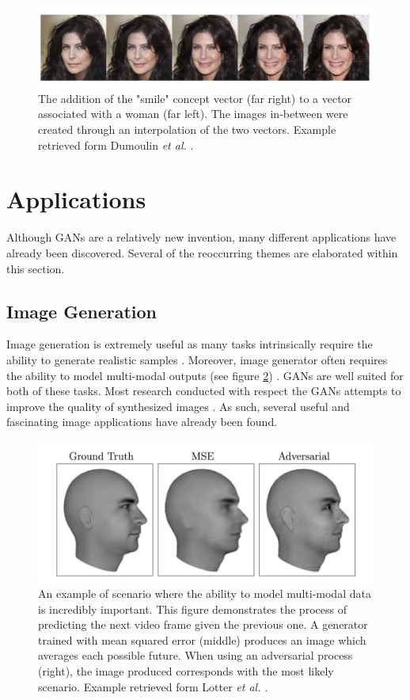 \documentclass[11pt]{article}
\begin{document}
\begin{figure}
\centering
\includegraphics[scale=0.40]{smile_concept_vector}
\caption{The addition of the "smile" concept vector (far right) to a vector associated with a woman (far left). The images in-between were created through an interpolation of the two vectors. Example retrieved form Dumoulin \textit{et al.} \citep{2016arXiv160600704D}.}
\label{fig:conceptvector}
\end{figure}



\section{Applications} \label{sec:applications}
Although GANs are a relatively new invention, many different applications have already been discovered. Several of the reoccurring themes are elaborated within this section.

\subsection{Image Generation} \label{sec:img2img}
Image generation is extremely useful as many tasks intrinsically require the ability to generate realistic samples \citep{2017arXiv170100160G}. Moreover, image generator often requires the ability to model multi-modal outputs (see figure \ref{fig:multimodal}) \citep{2017arXiv170100160G}. GANs are well suited for both of these tasks. Most research conducted with respect the GANs attempts to improve the quality of synthesized images \citep{2017arXiv171007035C}. As such, several useful and fascinating image applications have already been found.

\begin{figure}
\centering
\includegraphics[scale=0.9]{multimodal}
\caption{An example of scenario where the ability to model multi-modal data is incredibly important. This figure demonstrates the process of predicting the next video frame given the previous one. A generator trained with mean squared error (middle) produces an image which averages each possible future. When using an adversarial process (right), the image produced corresponds with the most likely scenario. Example retrieved form Lotter \textit{et al.} \citep{2015arXiv151106380L}.}
\label{fig:multimodal}
\end{figure}
\end{document}
